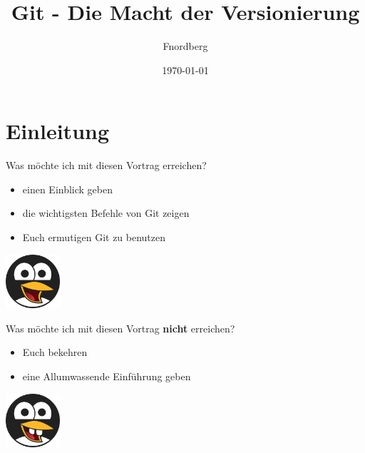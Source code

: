 \documentclass{beamer}
\title{Git - Die Macht der Versionierung}
\author{Fnordberg}
\date{\today}
\begin{document}
\maketitle

\section{Einleitung}

\begin{frame}{Was möchte ich mit diesen Vortrag erreichen?}
    \begin{minipage}[b]{80mm}
        \begin{itemize}
            \item einen Einblick geben
            \item die wichtigsten Befehle von Git zeigen
            \item Euch ermutigen Git zu benutzen
        \end{itemize}
    \end{minipage}
            \hfill
    \begin{minipage}[b]{20mm}
        \includegraphics[width=20mm]{pictures/pic-tux_1.png}
    \end{minipage}
\end{frame}

\begin{frame}{Was möchte ich mit diesen Vortrag 
                    \textbf{nicht} erreichen?}
                    
    \begin{minipage}[b]{80mm}
        \begin{itemize}
            \item Euch bekehren
            \item eine Allumwassende Einführung geben
        \end{itemize}
    \end{minipage}
        \hfill
    \begin{minipage}[b]{20mm}
         \includegraphics[width=20mm]{pictures/pic-tux_2.png}
    \end{minipage}

\end{frame}
\end{document}
